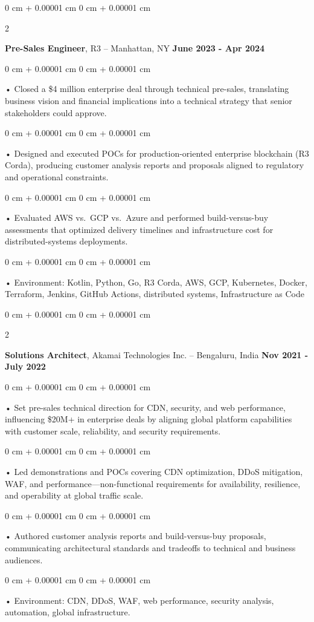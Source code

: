 \documentclass[10pt, letterpaper]{article}
\newenvironment{onecolentry}{
    \begin{adjustwidth}{
        0 cm + 0.00001 cm
    }{
        0 cm + 0.00001 cm
    }
}{
    \end{adjustwidth}
} %
\newenvironment{twocolentry}[2][]{
    \onecolentry
    \def\secondColumn{#2}
    \setcolumnwidth{\fill, 4.5 cm}
    \begin{paracol}{2}
}{
    \switchcolumn \raggedleft \secondColumn
    \end{paracol}
    \endonecolentry
} %
\begin{document}
        \begin{twocolentry}{
            \textbf{June 2023 - Apr 2024}
        }
            \textbf{Pre-Sales Engineer}, R3 -- Manhattan, NY\end{twocolentry}


        \begin{onecolentry}
             • Closed a \$4 million enterprise deal through technical pre-sales, translating business vision and financial implications into a technical strategy that senior stakeholders could approve.
        \end{onecolentry}
        \begin{onecolentry}
             • Designed and executed POCs for production-oriented enterprise blockchain (R3 Corda), producing customer analysis reports and proposals aligned to regulatory and operational constraints.
        \end{onecolentry}
        \begin{onecolentry}
             • Evaluated AWS vs.\ GCP vs.\ Azure and performed build-versus-buy assessments that optimized delivery timelines and infrastructure cost for distributed-systems deployments.
        \end{onecolentry}
        \begin{onecolentry}
             • Environment: Kotlin, Python, Go, R3 Corda, AWS, GCP, Kubernetes, Docker, Terraform, Jenkins, GitHub Actions, distributed systems, Infrastructure as Code
        \end{onecolentry}
        \vspace{0.1cm}

        \begin{twocolentry}{
            \textbf{Nov 2021 - July 2022}
        }
            \textbf{Solutions Architect}, Akamai Technologies Inc. -- Bengaluru, India \end{twocolentry}
        \begin{onecolentry}
            • Set pre-sales technical direction for CDN, security, and web performance, influencing \$20M+ in enterprise deals by aligning global platform capabilities with customer scale, reliability, and security requirements.
        \end{onecolentry}
        \begin{onecolentry}
            • Led demonstrations and POCs covering CDN optimization, DDoS mitigation, WAF, and performance---non-functional requirements for availability, resilience, and operability at global traffic scale.
        \end{onecolentry}
        \begin{onecolentry}
             • Authored customer analysis reports and build-versus-buy proposals, communicating architectural standards and tradeoffs to technical and business audiences.
        \end{onecolentry}
        \begin{onecolentry}
             • Environment: CDN, DDoS, WAF, web performance, security analysis, automation, global infrastructure.
        \end{onecolentry}
\end{document}
